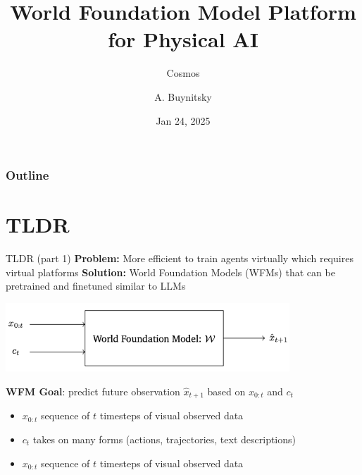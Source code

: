 \documentclass{beamer}
\title[Cosmos ]{World Foundation Model Platform for Physical AI}
\subtitle{Cosmos} %
\author[Comma]{A. Buynitsky}
\date{Jan 24, 2025}
\begin{document}
\frame{\titlepage}


\begin{frame}
\frametitle{Outline}
\tableofcontents
\end{frame}
\section{TLDR}
\begin{frame}[t]{TLDR (part 1)}
    \textbf{Problem:} More efficient to train agents virtually which requires virtual platforms \newline
    \textbf{Solution:} World Foundation Models (WFMs) that can be pretrained and finetuned similar to LLMs\newline
    \begin{center}
        \includegraphics[width=0.8\textwidth]{./img/tldr_2.png}
    \end{center}
    \textbf{WFM Goal}: predict future observation $\hat{x}_{t+1}$ based on $ x_{0:t}$ and $c_t$
    \small
    \begin{itemize}[label=-]
        \item $ x_{0:t}$ sequence of $t$ timesteps of visual observed data
        \item $c_t$ takes on many forms (actions, trajectories, text descriptions)
        \item $ x_{0:t}$ sequence of $t$ timesteps of visual observed data
    \end{itemize}
    \normalsize
            
\end{frame}
\end{document}
